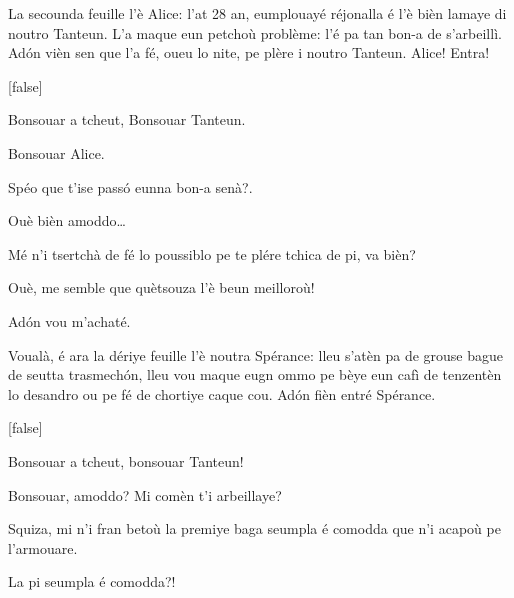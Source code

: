\begin{drama}

\Mariespeaks La secounda feuille l'è Alice: l'at 28 an, eumplouayé réjonalla é l'è bièn lamaye di noutro Tanteun. L'a maque eun petchoù problème: l'é pa tan bon-a de s'arbeillì. Ad\'on vièn sen que l'a fé, oueu lo nite, pe plère i noutro Tanteun. Alice! Entra!

[false]%


\Alicespeaks {} Bonsouar a tcheut, Bonsouar Tanteun. 

\Tanteunspeaks Bonsouar Alice.

\Alicespeaks Spéo que t'ise pass\'o eunna bon-a senà?.

\Tanteunspeaks Ouè bièn amoddo\ldots

\Alicespeaks Mé n'i tsertchà de fé lo poussiblo pe te plére tchica de pi, va bièn?

\Tanteunspeaks{} Ouè, me semble que quètsouza l'è beun meilloroù!

\Alicespeaks Ad\'on vou m'achaté.


\Mariespeaks{} Voualà, é ara la dériye feuille l'è noutra Spérance: lleu s'atèn pa de grouse bague de seutta trasmech\'on,  lleu vou maque eugn ommo pe bèye eun cafì de tenzentèn lo desandro ou pe fé de chortiye caque cou. Ad\'on fièn entré Spérance.

[false]%


\Sperancespeaks Bonsouar a tcheut, bonsouar Tanteun!

\Tanteunspeaks{} Bonsouar, amoddo? Mi comèn t'i arbeillaye?

\Sperancespeaks Squiza, mi n'i fran betoù la premiye baga seumpla é comodda que n'i acapoù pe l'armouare.

\Tanteunspeaks La pi seumpla é comodda?!


\end{drama}
